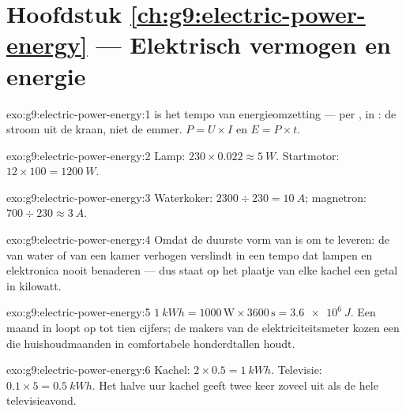\section*{Hoofdstuk \ref{ch:g9:electric-power-energy} --- Elektrisch vermogen en energie}

\begin{solution}{exo:g9:electric-power-energy:1}
 is het tempo van energieomzetting ---
 per , in : de stroom uit de kraan,
niet de emmer. $P = U \times I$ en $E = P \times t$.
\end{solution}

\begin{solution}{exo:g9:electric-power-energy:2}
Lamp: $230 \times 0.022 \approx \qty{5}{W}$. Startmotor: $12 \times 100
= \qty{1200}{W}$.
\end{solution}

\begin{solution}{exo:g9:electric-power-energy:3}
Waterkoker: $2300 \div 230 = \qty{10}{A}$; magnetron: $700 \div 230
\approx \qty{3}{A}$.
\end{solution}

\begin{solution}{exo:g9:electric-power-energy:4}
Omdat  de duurste vorm van  is om te leveren: de
 van water of van een kamer verhogen verslindt
 in een tempo dat lampen en elektronica nooit benaderen
--- dus staat op het plaatje van elke kachel een getal in kilowatt.
\end{solution}

\begin{solution}{exo:g9:electric-power-energy:5}
$\qty{1}{kWh} = 1000 \, \text{W} \times 3600 \, \text{s} =
\qty{3.6e6}{J}$. Een maand in  loopt op tot tien cijfers;
de makers van de elektriciteitsmeter kozen een  die
huishoudmaanden in comfortabele honderdtallen houdt.
\end{solution}

\begin{solution}{exo:g9:electric-power-energy:6}
Kachel: $2 \times 0.5 = \qty{1}{kWh}$. Televisie: $0.1 \times 5 =
\qty{0.5}{kWh}$. Het halve uur kachel geeft twee keer zoveel uit als de
hele televisieavond.
\end{solution}

